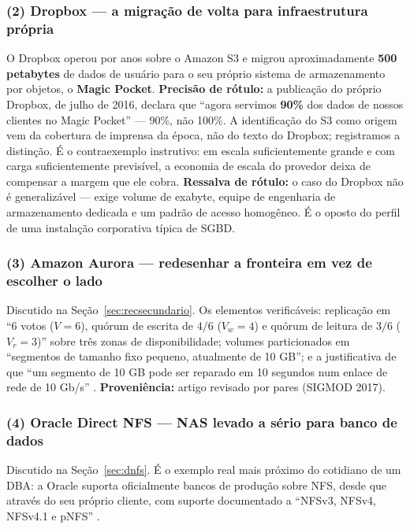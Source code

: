 \documentclass[11pt,a4paper]{article}
\begin{document}
\subsubsection*{(2) Dropbox --- a migração de volta para infraestrutura própria}

O Dropbox operou por anos sobre o Amazon S3 e migrou aproximadamente \textbf{500 petabytes} de
dados de usuário para o seu próprio sistema de armazenamento por objetos, o \textbf{Magic Pocket}.
\textbf{Precisão de rótulo:} a publicação do próprio Dropbox, de julho de 2016, declara que ``agora
servimos \textbf{90\%} dos dados de nossos clientes no Magic Pocket'' \cite{dropboxmp} --- 90\%, não
100\%. A identificação do S3 como origem vem da cobertura de imprensa da época, não do texto do
Dropbox; registramos a distinção. É o contraexemplo instrutivo: em escala
suficientemente grande e com carga suficientemente previsível, a economia de escala do provedor
deixa de compensar a margem que ele cobra. \textbf{Ressalva de rótulo:} o caso do Dropbox não é
generalizável --- exige volume de exabyte, equipe de engenharia de armazenamento dedicada e um
padrão de acesso homogêneo. É o oposto do perfil de uma instalação corporativa típica de SGBD.

\subsubsection*{(3) Amazon Aurora --- redesenhar a fronteira em vez de escolher o lado}

Discutido na Seção~\ref{sec:recsecundario}. Os elementos verificáveis: replicação em ``6 votos
($V = 6$), quórum de escrita de $4/6$ ($V_w = 4$) e quórum de leitura de $3/6$ ($V_r = 3$)'' sobre
três zonas de disponibilidade; volumes particionados em ``segmentos de tamanho fixo pequeno,
atualmente de 10 GB''; e a justificativa de que ``um segmento de 10 GB pode ser reparado em 10
segundos num enlace de rede de 10 Gb/s'' \cite{aurora2017}. \textbf{Proveniência:} artigo revisado
por pares (SIGMOD 2017).

\subsubsection*{(4) Oracle Direct NFS --- NAS levado a sério para banco de dados}

Discutido na Seção~\ref{sec:dnfs}. É o exemplo real mais próximo do cotidiano de um DBA: a Oracle
suporta oficialmente bancos de produção sobre NFS, desde que através do seu próprio cliente, com
suporte documentado a ``NFSv3, NFSv4, NFSv4.1 e pNFS'' \cite{oracledn}.
\end{document}
